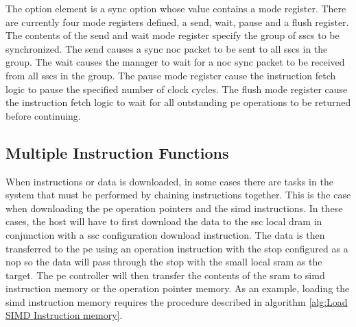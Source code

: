 The option element is a sync option whose value contains a mode register.
There are currently four mode registers defined, a send, wait, pause and a flush register.
The contents of the send and wait mode register specify the group of \acp{ssc} to be synchronized. 
The send causes a sync \ac{noc} packet to be sent to all \acp{ssc} in the group.
The wait causes the manager to wait for a \ac{noc} sync packet to be received from all \acp{ssc} in the group.
The pause mode register cause the instruction fetch logic to pause the specified number of clock cycles.
The flush mode register cause the instruction fetch logic to wait for all outstanding \ac{pe} operations to be returned before continuing.

\subsection{Multiple Instruction Functions}
\label{sec:Multiple Instruction Functions}

When instructions or data is downloaded, in some cases there are tasks in the system that must be performed by chaining instructions together.
This is the case when downloading the \ac{pe} operation pointers and the \ac{simd} instructions.
In these cases, the host will have to first download the data to the \ac{ssc} local \ac{dram} in conjunction with a \ac{ssc} configuration download instruction.
The data is then transferred to the \ac{pe} using an operation instruction with the \ac{stop} configured as a \ac{nop} so the data will pass through the \ac{stop} with the small local \ac{sram} as the target. 
The \ac{pe} controller will then transfer the contents of the \ac{sram} to \ac{simd} instruction memory or the operation pointer memory.
As an example, loading the \ac{simd} instruction memory requires the procedure described in algorithm \ref{alg:Load SIMD Instruction memory}.


